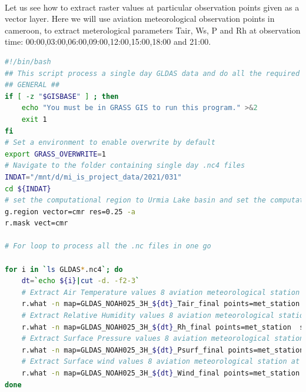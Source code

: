 \paragraph{}
Let us see how to extract raster values at particular observation points given as a vector layer. 
Here we will use aviation meteorological observation points in cameroon, to extract meterological parameters
Tair, Ws, P and Rh at observation time: 00:00,03:00,06:00,09:00,12:00,15:00,18:00 and 21:00.
\begin{lstlisting}[language=Bash]
#!/bin/bash
## This script process a single day GLDAS data and do all the required conversions needed for PySEBAL
## GENERAL ##
if [ -z "$GISBASE" ] ; then
    echo "You must be in GRASS GIS to run this program." >&2
    exit 1
fi
# Set a environment to enable overwrite by default
export GRASS_OVERWRITE=1
# Navigate to the folder containing single day .nc4 files
INDAT="/mnt/d/mi_is_project_data/2021/031" 
cd ${INDAT}
# set the computational region to Urmia Lake basin and set the computational resolution to 0.25 degrees
g.region vector=cmr res=0.25 -a
r.mask vect=cmr

# For loop to process all the .nc files in one go

for i in `ls GLDAS*.nc4`; do
    dt=`echo ${i}|cut -d. -f2-3`
    # Extract Air Temperature values 8 aviation meteorological station at time = dt and save the value in .csv file
    r.what -n map=GLDAS_NOAH025_3H_${dt}_Tair_final points=met_station  sep=comma output=a_temp_${dt}Z.csv
    # Extract Relative Humidity values 8 aviation meteorological station at time = dt and save the value in .csv file
    r.what -n map=GLDAS_NOAH025_3H_${dt}_Rh_final points=met_station  sep=comma output=a_rh_${dt}Z.csv
    # Extract Surface Pressure values 8 aviation meteorological station at time = dt and save the value in .csv file
    r.what -n map=GLDAS_NOAH025_3H_${dt}_Psurf_final points=met_station  sep=comma output=a_p_${dt}Z.csv
    # Extract Surface wind values 8 aviation meteorological station at time = dt and save the value in .csv file
    r.what -n map=GLDAS_NOAH025_3H_${dt}_Wind_final points=met_station  sep=comma output=a_ws_${dt}Z.csv
done
\end{lstlisting}
